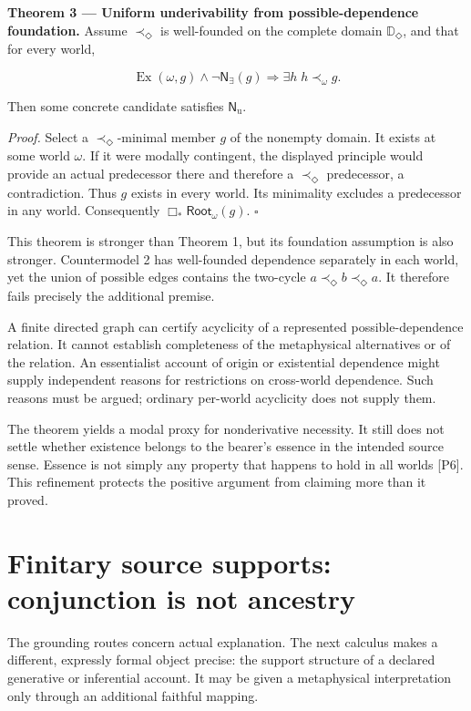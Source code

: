 \documentclass[11pt,a4paper]{article}
\begin{document}
\textbf{Theorem 3 --- Uniform underivability from possible-dependence
foundation.} Assume \(\prec_\Diamond\) is well-founded on the complete
domain \(\mathbb D_\Diamond\), and that for every world,

\nopagebreak[4]

\[
\operatorname{Ex}(\omega,g)\land\neg\mathsf N_{\exists}(g)
\Longrightarrow
\exists h\;h\prec_\omega g.
\]

Then some concrete candidate satisfies \(\mathsf N_{\mathrm u}\).

\emph{Proof.} Select a \(\prec_\Diamond\)-minimal member \(g\) of the
nonempty domain. It exists at some world \(\omega\). If it were modally
contingent, the displayed principle would provide an actual predecessor
there and therefore a \(\prec_\Diamond\) predecessor, a contradiction.
Thus \(g\) exists in every world. Its minimality excludes a predecessor
in any world. Consequently \(\Box_*\mathsf{Root}_\omega(g)\).
\(\square\)

This theorem is stronger than Theorem 1, but its foundation assumption
is also stronger. Countermodel 2 has well-founded dependence separately
in each world, yet the union of possible edges contains the two-cycle
\(a\prec_\Diamond b\prec_\Diamond a\). It therefore fails precisely the
additional premise.

A finite directed graph can certify acyclicity of a represented
possible-dependence relation. It cannot establish completeness of the
metaphysical alternatives or of the relation. An essentialist account of
origin or existential dependence might supply independent reasons for
restrictions on cross-world dependence. Such reasons must be argued;
ordinary per-world acyclicity does not supply them.

The theorem yields a modal proxy for nonderivative necessity. It still
does not settle whether existence belongs to the bearer's essence in the
intended source sense. Essence is not simply any property that happens
to hold in all worlds {[}P6{]}. This refinement protects the positive
argument from claiming more than it proved.

\section{Finitary source supports: conjunction is not
ancestry}\label{finitary-source-supports-conjunction-is-not-ancestry}

The grounding routes concern actual explanation. The next calculus makes
a different, expressly formal object precise: the support structure of a
declared generative or inferential account. It may be given a
metaphysical interpretation only through an additional faithful mapping.
\end{document}
